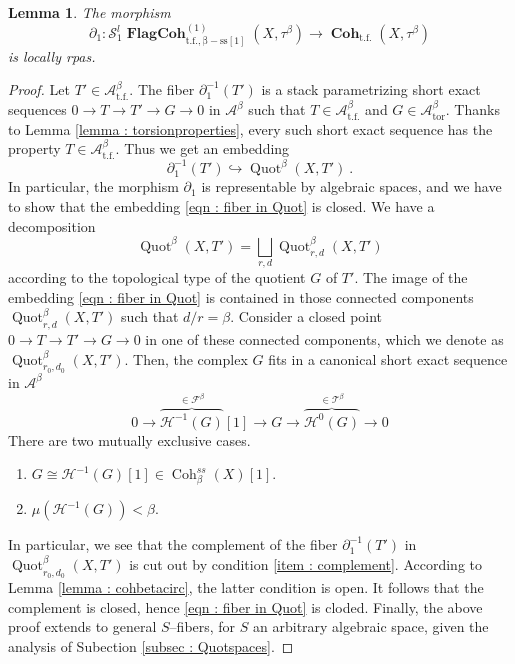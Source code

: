 \documentclass[11pt]{article}
\newtheorem{lemma}[theorem]{Lemma}
\newcommand{\segal}{\mathcal{S}}
\newcommand{\fbeta}{\mathcal{F}^{\beta}}
\newcommand{\tbeta}{\mathcal{T}^{\beta}}
\newcommand{\abeta}{\mathcal{A}^{\beta}}
\newcommand{\abetator}{\mathcal{A}^{\beta}_{\operatorname{tor}}}
\newcommand{\abetatf}{\mathcal{A}^{\beta}_{\operatorname{t.f.}}}
\newcommand{\abetatfstack}{\boldsymbol{\operatorname{Coh}}_{\operatorname{t.f.}}(X,\tau^{\beta})}
\newcommand{\cohbetass}{\operatorname{Coh}^{ss}_{\beta}(X)}
\begin{document}
    \begin{lemma}\label{lemma : aux rpas}
        The morphism 
        \[
            \partial_1 \colon \segal_1^l\boldsymbol{\operatorname{FlagCoh}}^{(1)}_{\operatorname{t.f.,\beta-ss[1]}}(X,\tau^\beta) \rightarrow \abetatfstack
        \]
        is locally rpas.
    \end{lemma}
    \begin{proof}
        Let $T'\in \abetatf$. The fiber $\partial_1^{-1}(T')$ is a stack parametrizing short exact sequences $0 \rightarrow T\rightarrow T'\rightarrow G \rightarrow 0$ in $\abeta$ such that $T\in \abetatf$ and $G\in \abetator$. Thanks to Lemma \ref{lemma : torsionproperties}, every such short exact sequence has the property $T\in \abetatf$. Thus we get an embedding
        \begin{equation}\label{eqn : fiber in Quot}
            \partial_1^{-1}(T') \hookrightarrow\operatorname{Quot}^\beta(X,T') \ .
        \end{equation}
       In particular, the morphism $\partial_1$ is representable by algebraic spaces, and we have to show that the embedding \eqref{eqn : fiber in Quot} is closed. We have a decomposition 
        \[
            \operatorname{Quot}^\beta(X,T') = \bigsqcup_{r,d}\operatorname{Quot}_{r,d}^\beta(X,T')
        \]
        according to the topological type of the quotient $G$ of $T'$. The image of the embedding \eqref{eqn : fiber in Quot} is contained in those connected components $\operatorname{Quot}_{r,d}^\beta(X,T')$ such that $d/r = \beta$. Consider a closed point
        $0\rightarrow T\rightarrow T'\rightarrow G \rightarrow 0$ in one of these connected components, which we denote as $\operatorname{Quot}_{r_0,d_0}^\beta(X,T')$. Then, the complex $G$ fits in a canonical short exact sequence in $\abeta$ 
        \[
            0\rightarrow \overbrace{\mathcal{H}^{-1}(G)}^{\in \fbeta}[1]\rightarrow G \rightarrow \overbrace{\mathcal{H}^{0}(G)}^{\in\tbeta} \rightarrow 0
        \]
        There are two mutually exclusive cases.
        \begin{enumerate}
            \item $G \cong \mathcal{H}^{-1}(G)[1] \in \cohbetass[1]$.
            \item\label{item : complement} $\mu(\mathcal{H}^{-1}(G)) < \beta$.
        \end{enumerate}
        In particular, we see that the complement of the fiber $\partial_1^{-1}(T')$ in $\operatorname{Quot}_{r_0,d_0}^\beta(X,T')$ is cut out by condition \ref{item : complement}. According to Lemma \ref{lemma : cohbetacirc}, the latter condition is open. It follows that the complement is closed, hence \eqref{eqn : fiber in Quot} is cloded. Finally, the above proof extends to general $S$--fibers, for $S$ an arbitrary algebraic space, given the analysis of Subection \ref{subsec : Quotspaces}. 
    \end{proof}
\end{document}
